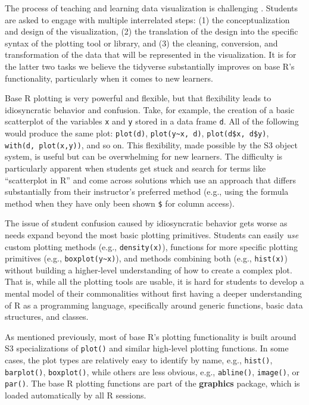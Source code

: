 \documentclass[12pt]{article}
\begin{document}
The process of teaching and learning data visualization is challenging
\citep{nolaperr_2016}. Students are asked to engage with multiple
interrelated steps: (1) the conceptualization and design of the
visualization, (2) the translation of the design into the specific
syntax of the plotting tool or library, and (3) the cleaning,
conversion, and transformation of the data that will be represented in
the visualization. It is for the latter two tasks we believe the
tidyverse substantially improves on base R's functionality, particularly
when it comes to new learners.

Base R plotting is very powerful and flexible, but that flexibility
leads to idiosyncratic behavior and confusion. Take, for example, the
creation of a basic scatterplot of the variables \texttt{x} and
\texttt{y} stored in a data frame \texttt{d}. All of the following would
produce the same plot: \texttt{plot(d)},
\texttt{plot(y\textasciitilde{}x,\ d)}, \texttt{plot(d\$x,\ d\$y)},
\texttt{with(d,\ plot(x,y))}, and so on. This flexibility, made possible
by the S3 object system, is useful but can be overwhelming for new
learners. The difficulty is particularly apparent when students get
stuck and search for terms like ``scatterplot in R'' and come across
solutions which use an approach that differs substantially from their
instructor's preferred method (e.g., using the formula method when they
have only been shown \texttt{\$} for column access).

The issue of student confusion caused by idiosyncratic behavior gets
worse as needs expand beyond the most basic plotting primitives.
Students can easily \emph{use} custom plotting methods (e.g.,
\texttt{density(x)}), functions for more specific plotting primitives
(e.g., \texttt{boxplot(y\textasciitilde{}x)}), and methods combining
both (e.g., \texttt{hist(x)}) without building a higher-level
understanding of how to create a complex plot. That is, while all the
plotting tools are usable, it is hard for students to develop a mental
model of their commonalities without first having a deeper understanding
of R as a programming language, specifically around generic functions,
basic data structures, and classes.

As mentioned previously, most of base R's plotting functionality is
built around S3 specializations of \texttt{plot()} and similar
high-level plotting functions. In some cases, the plot types are
relatively easy to identify by name, e.g., \texttt{hist()},
\texttt{barplot()}, \texttt{boxplot()}, while others are less obvious,
e.g., \texttt{abline()}, \texttt{image()}, or \texttt{par()}. The base R
plotting functions are part of the \textbf{graphics} package, which is
loaded automatically by all R sessions.
\end{document}
